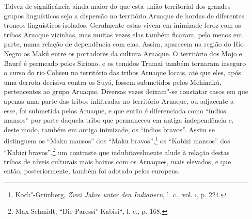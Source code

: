 Talvez de significância ainda maior do que esta união territorial dos
grandes grupos linguísticos seja a dispersão no território Aruaque de
hordas de diferentes troncos linguísticos isolados. Geralmente estas
vivem em inimizade feroz com as tribos Aruaque vizinhas, mas muitas
vezes elas também ficaram, pelo menos em parte, numa relação de
dependência com elas. Assim, aparecem na região do Rio Negro os Makú
entre os portadores da cultura Aruaque. O território dos Mojo e Bauré é
permeado pelos Siriono, e os temidos Trumai também tornaram inseguro o
curso do rio Coliseu no território das tribos Aruaque locais, até que
eles, após uma derrota decisiva contra os Suyá, fossem submetidos pelos
Mehinakú, pertencentes ao grupo Aruaque. Diversas vezes deixam"-se
constatar casos em que apenas uma parte das tribos infiltradas no
território Aruaque, ou adjacente a esse, foi submetida pelos Aruaque, e
que então é diferenciada como ``índios mansos'' por parte daquela tribo
que permaneceu em antiga independência e, deste modo, também em antiga
inimizade, os ``índios bravos''. Assim se distinguem os ``Maku mansos''
dos ``Maku bravos'',\footnote{Koch"-Grünberg, \emph{Zwei Jahre unter den
  Indianern}, l. c., vol. \textsc{i}, p. 224.} os ``Kabizi mansos'' dos ``Kabizi
bravos'',\footnote{Max Schmidt, ``Die Paressí"-Kabisí``, l. c., p. 168.}
um contraste que indubitavelmente alude à relação destas tribos de
níveis culturais mais baixos com os Aruaques, mais elevados, e que
então, posteriormente, também foi adotado pelos europeus.

